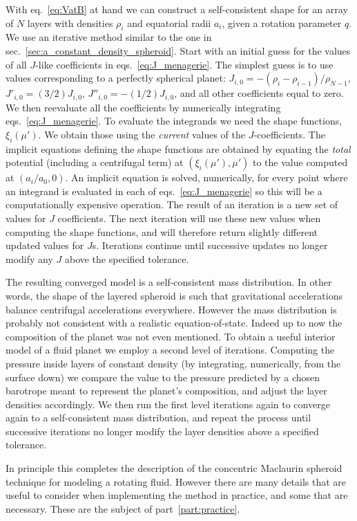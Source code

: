 \documentclass[amsmath,amsfonts,rmp,letterpaper]{revtex4}
\begin{document}
With eq.~\eqref{eq:VatB} at hand we can construct a self-consistent shape for an
array of $N$ layers with densities $\rho_i$ and equatorial radii $a_i$, given a
rotation parameter $q$. We use an iterative method similar to the one in
sec.~\ref{sec:a_constant_density_spheroid}. Start with an initial guess for the
values of all $J$-like coefficients in eqs.~\eqref{eq:J_menagerie}. The simplest
guess is to use values corresponding to a perfectly spherical planet:
$J_{i,0}=-(\rho_i-\rho_{i-1})/\rho_{N-1}$, $J'_{i,0}=(3/2)J_{i,0}$,
$J''_{i,0}=-(1/2)J_{i,0}$, and all other coefficients equal to zero. We then
reevaluate all the coefficients by numerically integrating
eqs.~\eqref{eq:J_menagerie}. To evaluate the integrands we need the shape
functions, $\xi_i(\mu')$. We obtain those using the \emph{current} values of the
$J$-coefficients. The implicit equations defining the shape functions are obtained
by equating the \emph{total} potential (including a centrifugal term) at
$(\xi_i(\mu'),\mu')$ to the value computed at $(a_i/a_0,0)$. An implicit equation
is solved, numerically, for every point where an integrand is evaluated in each of
eqs.~\eqref{eq:J_menagerie} so this will be a computationally expensive operation.
The result of an iteration is a new set of values for $J$ coefficients. The next
iteration will use these new values when computing the shape functions, and will
therefore return slightly different updated values for $J$s. Iterations continue
until successive updates no longer modify any $J$ above the specified tolerance.

The resulting converged model is a self-consistent mass distribution. In other
words, the shape of the layered spheroid is such that gravitational accelerations
balance centrifugal accelerations everywhere. However the mass distribution is
probably not consistent with a realistic equation-of-state. Indeed up to now the
composition of the planet was not even mentioned. To obtain a useful interior
model of a fluid planet we employ a second level of iterations. Computing the
pressure inside layers of constant density (by integrating, numerically, from the
surface down) we compare the value to the pressure predicted by a chosen barotrope
meant to represent the planet's composition, and adjust the layer densities
accordingly. We then run the first level iterations again to converge again to a
self-consistent mass distribution, and repeat the process until successive
iterations no longer modify the layer densities above a specified tolerance.

In principle this completes the description of the concentric Maclaurin spheroid
technique for modeling a rotating fluid. However there are many details that are
useful to consider when implementing the method in practice, and some that are
necessary. These are the subject of part~\ref{part:practice}.
\end{document}
